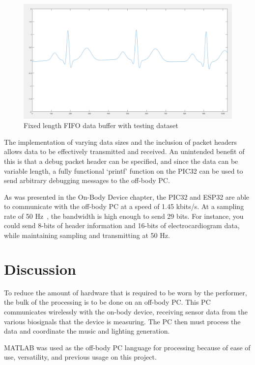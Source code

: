 \begin{figure}[!ht]
  \caption{Fixed length FIFO data buffer with testing dataset}\label{fig:matlab_packet_test2}
  \centering
  \includegraphics[width=1\columnwidth]{chapters/development/MATLAB/FULL_FILLED}
\end{figure}

The implementation of varying data sizes and the inclusion of packet headers allows data to be effectively transmitted and received.
An unintended benefit of this is that a debug packet header can be specified, and since the data can be variable length,
a fully functional `printf' function on the PIC32 can be used to send arbitrary debugging messages to the off-body PC.

As was presented in the On-Body Device chapter, the PIC32 and ESP32 are able to communicate with the off-body PC at a speed of 1.45 kbits/s.
At a sampling rate of 50 Hz~\cite{Ajdaraga:2017}, the bandwidth is high enough to send 29 bits.
For instance, you could send 8-bits of header information and 16-bits of electrocardiogram data, while maintaining sampling and transmitting at 50 Hz.


\section{Discussion}
To reduce the amount of hardware that is required to be worn by the performer,
the bulk of the processing is to be done on an off-body PC.
This PC communicates wirelessly with the on-body device,
receiving sensor data from the various biosignals that the device is measuring.
The PC then must process the data and coordinate the music and lighting generation.

MATLAB was used as the off-body PC language for processing because of ease of use, versatility,
and previous usage on this project.

